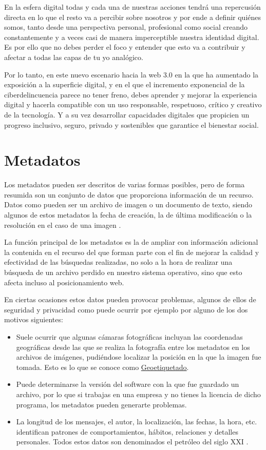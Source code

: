 \documentclass[
  spanish,
  a4paper,
  openany]{book}
\begin{document}
En la esfera digital todas y cada una de nuestras acciones tendrá una repercusión directa en lo que el resto va a percibir sobre nosotros y por ende a definir quiénes somos, tanto desde una perspectiva personal, profesional como social creando constantemente y a veces casi de manera imperceptible nuestra identidad digital. Es por ello que no debes perder el foco y entender que esto va a contribuir y afectar a todas las capas de tu yo analógico.

Por lo tanto, en este nuevo escenario hacia la web 3.0 en la que ha aumentado la exposición a la superficie digital, y en el que el incremento exponencial de la ciberdelincuencia parece no tener freno, debes aprender y mejorar la experiencia digital y hacerla compatible con un uso responsable, respetuoso, crítico y creativo de la tecnología. Y a su vez desarrollar capacidades digitales que propicien un progreso inclusivo, seguro, privado y sostenibles que garantice el bienestar social.

\hypertarget{metadatos}{%
\section{Metadatos}\label{metadatos}}

Los metadatos pueden ser descritos de varias formas posibles, pero de forma resumida son un conjunto de datos que proporciona información de un recurso. Datos como pueden ser un archivo de imagen o un documento de texto, siendo algunos de estos metadatos la fecha de creación, la de última modificación o la resolución en el caso de una imagen \citep{WIKI-meta}.

La función principal de los metadatos es la de ampliar con información adicional la contenida en el recurso del que forman parte con el fin de mejorar la calidad y efectividad de las búsquedas realizadas, no solo a la hora de realizar una búsqueda de un archivo perdido en nuestro sistema operativo, sino que esto afecta incluso al posicionamiento web.

En ciertas ocasiones estos datos pueden provocar problemas, algunos de ellos de seguridad y privacidad como puede ocurrir por ejemplo por alguno de los dos motivos siguientes:

\begin{itemize}
\item
  Suele ocurrir que algunas cámaras fotográficas incluyan las coordenadas geográficas desde las que se realiza la fotografía entre los metadatos en los archivos de imágenes, pudiéndose localizar la posición en la que la imagen fue tomada. Esto es lo que se conoce como \href{https://es.wikipedia.org/wiki/Geoetiquetado}{Geoetiquetado}.
\item
  Puede determinarse la versión del software con la que fue guardado un archivo, por lo que si trabajas en una empresa y no tienes la licencia de dicho programa, los metadatos pueden generarte problemas.
\item
  La longitud de los mensajes, el autor, la localización, las fechas, la hora, etc. identifican patrones de comportamientos, hábitos, relaciones y detalles personales. Todos estos datos son denominados el petróleo del siglo XXI \citep{OSI-petroleo-S-XXI}.
\end{itemize}
\end{document}
